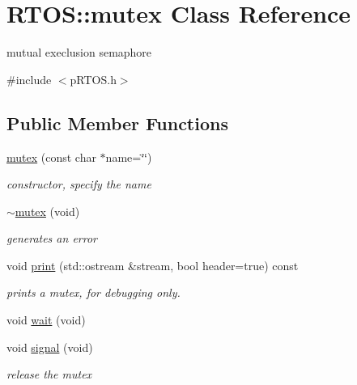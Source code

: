 \hypertarget{class_r_t_o_s_1_1mutex}{}\section{R\+T\+OS\+:\+:mutex Class Reference}
\label{class_r_t_o_s_1_1mutex}


mutual execlusion semaphore  




{\ttfamily \#include $<$p\+R\+T\+O\+S.\+h$>$}

\subsection*{Public Member Functions}
\begin{DoxyCompactItemize}
\item 
\hyperlink{class_r_t_o_s_1_1mutex_a018aed6b83cf182b9990ac90a3254904}{mutex} (const char $\ast$name=\char`\"{}\char`\"{})
\begin{DoxyCompactList}\small\item\em constructor, specify the name \end{DoxyCompactList}\item 
\hyperlink{class_r_t_o_s_1_1mutex_a58255b4d832c8140f2b45efcc2065733}{$\sim$mutex} (void)
\begin{DoxyCompactList}\small\item\em generates an error \end{DoxyCompactList}\item 
void \hyperlink{class_r_t_o_s_1_1mutex_aef6201cdf6b86c532629b5888d740303}{print} (std\+::ostream \&stream, bool header=true) const \hypertarget{class_r_t_o_s_1_1mutex_aef6201cdf6b86c532629b5888d740303}{}\label{class_r_t_o_s_1_1mutex_aef6201cdf6b86c532629b5888d740303}

\begin{DoxyCompactList}\small\item\em prints a mutex, for debugging only. \end{DoxyCompactList}\item 
void \hyperlink{class_r_t_o_s_1_1mutex_a52160d98a50d74a44fc4592a4625c6ed}{wait} (void)
\item 
void \hyperlink{class_r_t_o_s_1_1mutex_a9a6cb88e182f977bce35e024449b24cd}{signal} (void)
\begin{DoxyCompactList}\small\item\em release the mutex \end{DoxyCompactList}\end{DoxyCompactItemize}
